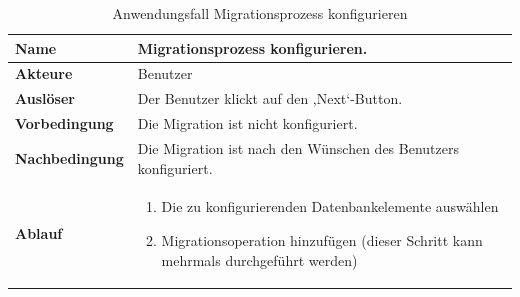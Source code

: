 \begin{table}[H]
	\centering
	\begin{tabular}{ |p{4cm}|p{8cm}| }
		\hline
		\textbf{Name} &  Migrationsprozess konfigurieren. \\
		\hline
		\textbf{Akteure} & Benutzer  \\
		\hline
		\textbf{Auslöser} & Der Benutzer klickt auf den ,Next‘-Button.  \\
		\hline
		\textbf{Vorbedingung} &  Die Migration ist nicht konfiguriert. \\
		\hline
		\textbf{Nachbedingung} &  Die Migration ist nach den Wünschen des Benutzers konfiguriert. \\
		\hline
		\textbf{Ablauf} & 
		\begin{enumerate}
			\item Die zu konfigurierenden Datenbankelemente auswählen
			\item Migrationsoperation hinzufügen (dieser Schritt kann mehrmals durchgeführt werden)
		\end{enumerate}   \\
		\hline
		
	\end{tabular}
	\caption{Anwendungsfall Migrationsprozess konfigurieren}
	\label{table:migration-cfg}
\end{table}



